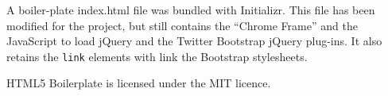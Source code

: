 A boiler-plate index.html file was bundled with Initializr. This file has been modified for the project, but still contains the ``Chrome Frame'' and the Java\-Script to load jQuery and the Twitter Bootstrap jQuery plug-ins. It also retains the \texttt{link} elements with link the Bootstrap stylesheets.

HTML5 Boilerplate is licensed under the MIT licence.